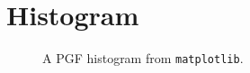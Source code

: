 \documentclass[a4paper]{article}
\begin{document}
\section{Histogram}

\begin{figure}[h]
    \begin{center}
        
    \end{center}
    \caption{A PGF histogram from \texttt{matplotlib}.}
\end{figure}
\end{document}
